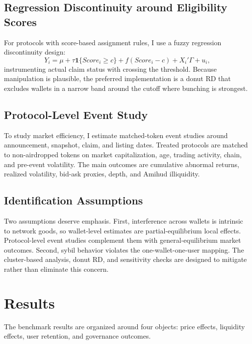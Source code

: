\documentclass[11pt]{article}
\theoremstyle{remark}
\begin{document}
\subsection{Regression Discontinuity around Eligibility Scores}

For protocols with score-based assignment rules, I use a fuzzy regression discontinuity design:
\begin{equation}
Y_i = \mu + \tau \mathbf{1}\{Score_i \ge c\} + f(Score_i-c) + X_i' \Gamma + u_i,
\label{eq:rd}
\end{equation}
instrumenting actual claim status with crossing the threshold. Because manipulation is plausible, the preferred implementation is a donut RD that excludes wallets in a narrow band around the cutoff where bunching is strongest.

\subsection{Protocol-Level Event Study}

To study market efficiency, I estimate matched-token event studies around announcement, snapshot, claim, and listing dates. Treated protocols are matched to non-airdropped tokens on market capitalization, age, trading activity, chain, and pre-event volatility. The main outcomes are cumulative abnormal returns, realized volatility, bid-ask proxies, depth, and Amihud illiquidity.

\subsection{Identification Assumptions}

Two assumptions deserve emphasis. First, interference across wallets is intrinsic to network goods, so wallet-level estimates are partial-equilibrium local effects. Protocol-level event studies complement them with general-equilibrium market outcomes. Second, sybil behavior violates the one-wallet-one-user mapping. The cluster-based analysis, donut RD, and sensitivity checks are designed to mitigate rather than eliminate this concern.

\section{Results}

The benchmark results are organized around four objects: price effects, liquidity effects, user retention, and governance outcomes.
\end{document}
